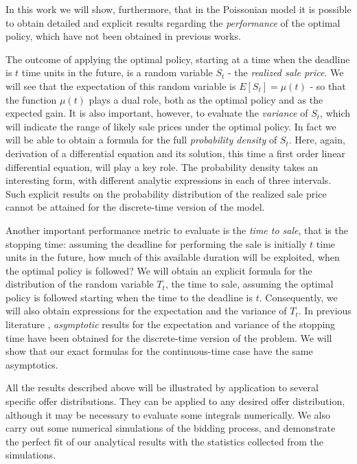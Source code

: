 \documentclass{article}
\numberwithin{equation}{section}
\begin{document}
In this work we will show, furthermore, that in the Poissonian model it is possible to obtain detailed and explicit 
results regarding the {\it{performance}} of the optimal policy, which have not been obtained in previous works.

The outcome of 
applying the optimal policy, starting at a time when the deadline is $t$ time units in the future, is a random variable $S_t$ - the {\it{realized sale price}}. We will see that the
expectation of this random variable is $E[S_t]=\mu(t)$ - so that the function $\mu(t)$ plays a dual role, both as the optimal policy and as the expected gain.
It is also important, however, to evaluate the {\it{variance}} of $S_t$, which will indicate the range of likely sale prices under the optimal policy.
In fact we will be able to obtain a formula for the full {\it{probability density}} of $S_t$. Here, again, derivation of
a differential equation and its solution, this time a first order linear differential equation, will play a key role.
The probability density takes an interesting form,
with different analytic expressions in each of three intervals. Such explicit results on the probability distribution of the realized sale price cannot be attained for the discrete-time version of the model.


Another important performance metric to evaluate  is the {\it{time to sale}}, that is the stopping time: assuming the deadline for performing the sale is initially $t$ time units in the future, how much of this available duration will be exploited, when the optimal policy is followed? 
We will obtain an explicit formula for the distribution of the random variable $T_t$, the time to sale, assuming the optimal policy is followed starting when the time to the deadline is $t$. Consequently, we will also obtain expressions for the expectation and the variance of $T_t$. In previous literature \cite{entwistle,Mazalov}, {\it{asymptotic}} results for the 
expectation and variance of the stopping time have been obtained
for the discrete-time version of the problem. We will show that our exact 
formulas for the continuous-time case have
the same asymptotics.


All the results described above will be 
illustrated by application to several specific offer 
distributions. They can be applied to any desired offer distribution, although it may be necessary to evaluate some integrals numerically.
We also carry out some numerical simulations of the bidding process, and demonstrate the perfect fit of our analytical results with the statistics collected from the simulations.
\end{document}
